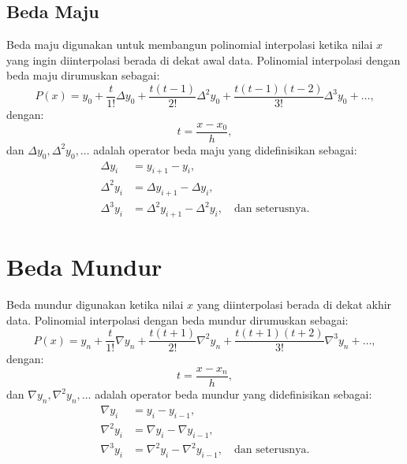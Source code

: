 \documentclass[a4paper,extrafontsizes, 9pt]{memoir}
\begin{document}
\begin{multicols}{3}
\subsection*{\small Beda Maju}
Beda maju digunakan untuk membangun polinomial interpolasi ketika nilai \( x \) yang ingin diinterpolasi berada di dekat awal data. Polinomial interpolasi dengan beda maju dirumuskan sebagai:
\[
P(x) = y_0 + \frac{t}{1!} \Delta y_0 + \frac{t(t-1)}{2!} \Delta^2 y_0 + \frac{t(t-1)(t-2)}{3!} \Delta^3 y_0 + \dots,
\]
dengan:
\[
t = \frac{x - x_0}{h},
\]
dan \( \Delta y_0, \Delta^2 y_0, \dots \) adalah operator beda maju yang didefinisikan sebagai:
\begin{align*}
\Delta y_i &= y_{i+1} - y_i, \\
\Delta^2 y_i &= \Delta y_{i+1} - \Delta y_i, \\
\Delta^3 y_i &= \Delta^2 y_{i+1} - \Delta^2 y_i, \quad \text{dan seterusnya.}
\end{align*}

\section*{\small Beda Mundur}
Beda mundur digunakan ketika nilai \( x \) yang diinterpolasi berada di dekat akhir data. Polinomial interpolasi dengan beda mundur dirumuskan sebagai:
\[
P(x) = y_n + \frac{t}{1!} \nabla y_n + \frac{t(t+1)}{2!} \nabla^2 y_n + \frac{t(t+1)(t+2)}{3!} \nabla^3 y_n + \dots,
\]
dengan:
\[
t = \frac{x - x_n}{h},
\]
dan \( \nabla y_n, \nabla^2 y_n, \dots \) adalah operator beda mundur yang didefinisikan sebagai:
\begin{align*}
\nabla y_i &= y_i - y_{i-1}, \\
\nabla^2 y_i &= \nabla y_i - \nabla y_{i-1}, \\
\nabla^3 y_i &= \nabla^2 y_i - \nabla^2 y_{i-1}, \quad \text{dan seterusnya.}
\end{align*}

   \end{multicols}
\end{document}
